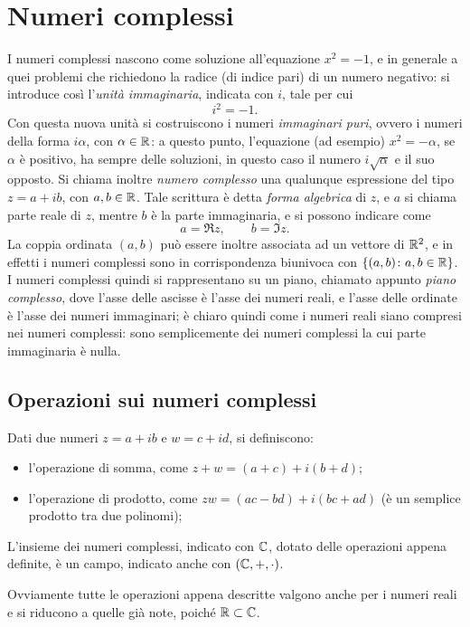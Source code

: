 \chapter{Numeri complessi}
I numeri complessi nascono come soluzione all'equazione $x^2=-1$, e in generale a quei problemi che richiedono la radice (di indice pari) di un numero negativo: si introduce così l'\emph{unità immaginaria}, indicata con $i$, tale per cui
\[
i^2=-1.
\]
Con questa nuova unità si costruiscono i numeri \emph{immaginari puri}, ovvero i numeri della forma $i\alpha$, con $\alpha\in\mathbb{R}$: a questo punto, l'equazione (ad esempio) $x^2=-\alpha$, se $\alpha$ è positivo, ha sempre delle soluzioni, in questo caso il numero $i\sqrt{\alpha}$ e il suo opposto.
Si chiama inoltre \emph{numero complesso} una qualunque espressione del tipo $z=a+ib$, con $a,b\in\mathbb{R}$. Tale scrittura è detta \emph{forma algebrica} di $z$, e $a$ si chiama parte reale di $z$, mentre $b$ è la parte immaginaria, e si possono indicare come
\[
a=\Re z,\qquad b=\Im z.
\]
La coppia ordinata $(a,b)$ può essere inoltre associata ad un vettore di $\mathbb{R}^2$, e in effetti i numeri complessi sono in corrispondenza biunivoca con $\{(a,b)\colon a,b\in\mathbb{R}\}$. I numeri complessi quindi si rappresentano su un piano, chiamato appunto \emph{piano complesso}, dove l'asse delle ascisse è l'asse dei numeri reali, e l'asse delle ordinate è l'asse dei numeri immaginari; è chiaro quindi come i numeri reali siano compresi nei numeri complessi: sono semplicemente dei numeri complessi la cui parte immaginaria è nulla.

\section{Operazioni sui numeri complessi}
Dati due numeri $z=a+ib$ e $w=c+id$, si definiscono:
\begin{itemize}
\item l'operazione di somma, come $z+w=(a+c)+i(b+d)$;
\item l'operazione di prodotto, come $zw=(ac-bd)+i(bc+ad)$ (è un semplice prodotto tra due polinomi);
\end{itemize}
\begin{teorema}
L'insieme dei numeri complessi, indicato con $\mathbb{C}$, dotato delle operazioni appena definite, è un campo, indicato anche con $(\mathbb{C},+,\cdot)$.
\end{teorema}
Ovviamente tutte le operazioni appena descritte valgono anche per i numeri reali e si riducono a quelle già note, poiché $\mathbb{R}\subset\mathbb{C}$.

